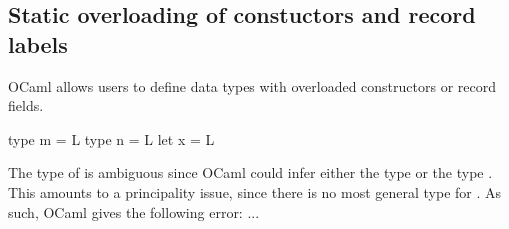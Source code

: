 \documentclass[acmsmall,screen,nonacm]{acmart}
\begin{document}




\subsection{Static overloading of constuctors and record labels}


OCaml allows users to define data types with overloaded constructors or
record fields.
\begin{program}
type m = L
type n = L
let x = L
\end{program}
The type of  is ambiguous since OCaml could infer either the type
 or the type . This amounts to a principality issue, since
there is no most general type for .   As such, OCaml gives the
following error: ...
\end{document}
